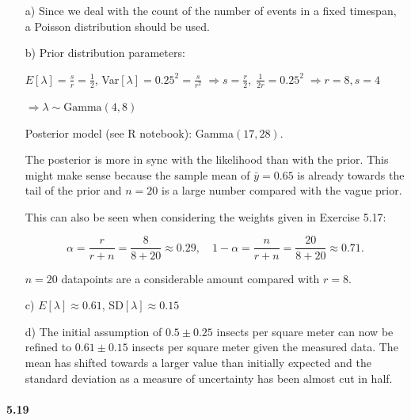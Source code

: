 \documentclass[fontsize=11pt,DIV=18,parskip=half]{scrartcl}
\begin{document}
\begin{enumerate}
\item[a)] Since we deal with the count of the number of events in a fixed timespan, a Poisson distribution should be used.

\item[b)] Prior distribution parameters:

$E[\lambda] = \frac{s}{r} = \frac12$, Var$[\lambda] = 0.25^2 = \frac{s}{r^2} \; \Rightarrow s = \frac{r}{2}, \;\frac{1}{2r} = 0.25^2 \; \Rightarrow r = 8, s=4$

$\Rightarrow \lambda \sim \text{Gamma}(4,8)$

Posterior model (see R notebook): Gamma$(17, 28)$.

The posterior is more in sync with the likelihood than with the prior. This might make sense because the sample mean of $\bar{y}=0.65$ is already towards the tail of the prior and $n=20$ is a large number compared with the vague prior.

This can also be seen when considering the weights given in Exercise 5.17:

\begin{equation*}
\alpha = \frac{r}{r+n} = \frac{8}{8+20} \approx 0.29, \quad 1-\alpha = \frac{n}{r+n} = \frac{20}{8+20} \approx 0.71.
\end{equation*}

$n=20$ datapoints are a considerable amount compared with $r=8$.

\item[c)] $E[\lambda] \approx 0.61$, SD$[\lambda] \approx 0.15$

\item[d)] The initial assumption of $0.5\pm0.25$ insects per square meter can now be refined to $0.61\pm0.15$ insects per square meter given the measured data. The mean has shifted towards a larger value than initially expected and the standard deviation as a measure of uncertainty has been almost cut in half.

\end{enumerate}

\paragraph{5.19}
\end{document}

